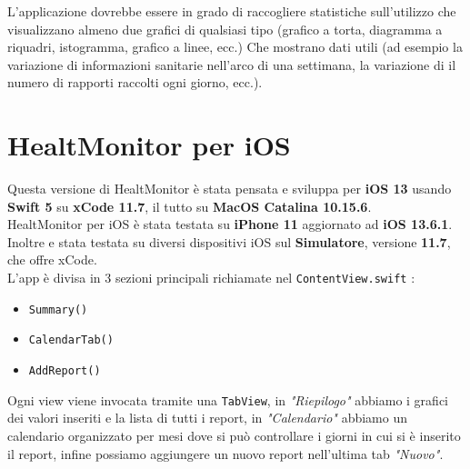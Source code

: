 \documentclass{article}
\begin{document}
L'applicazione dovrebbe essere in grado di raccogliere statistiche sull'utilizzo che visualizzano almeno due grafici di qualsiasi tipo (grafico a torta, diagramma a riquadri, istogramma, grafico a linee, ecc.) Che mostrano dati utili (ad esempio la variazione di informazioni sanitarie nell'arco di una settimana, la variazione di il numero di rapporti raccolti ogni giorno, ecc.).


\newpage
\section{HealtMonitor per iOS}

Questa versione di HealtMonitor è stata pensata e sviluppa per \textbf{iOS 13} usando \textbf{Swift 5} su \textbf{xCode 11.7}, il tutto su \textbf{MacOS Catalina 10.15.6}.\\
HealtMonitor per iOS è stata testata su \textbf{iPhone 11} aggiornato ad \textbf{iOS 13.6.1}. Inoltre e stata testata su diversi dispositivi iOS sul \textbf{Simulatore}, versione \textbf{11.7}, che offre xCode.\\


L'app è divisa in 3 sezioni principali richiamate nel \texttt{ContentView.swift} : 
\begin{itemize}
  \item \texttt{Summary()}
  \item \texttt{CalendarTab()}
  \item \texttt{AddReport() }
\end{itemize}

Ogni view viene invocata tramite una \texttt{TabView}, in \textit{"Riepilogo"} abbiamo i grafici dei valori inseriti e la lista di tutti i report, in \textit{"Calendario"} abbiamo un calendario organizzato per mesi dove si può controllare i giorni in cui si è inserito il report, infine possiamo aggiungere un nuovo report nell'ultima tab \textit{"Nuovo"}.

\medskip
\end{document}
